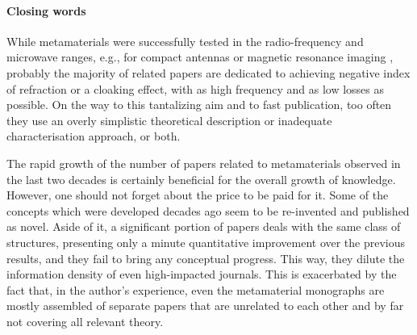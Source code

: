 

\paragraph{Closing words} 
While metamaterials were successfully tested in the radio-frequency and microwave ranges, e.g., for compact antennas or magnetic resonance imaging \cite{freire2008experimental}, probably the majority of related papers are dedicated to achieving negative index of refraction or a cloaking effect, with as high frequency and as low losses as possible.
On the way to this tantalizing aim and to fast publication, too often they use an overly simplistic theoretical description or inadequate characterisation approach, or both. %

The rapid growth of the  number of papers related to metamaterials observed in the last two decades is certainly beneficial for the overall growth of knowledge. However, one should not forget about the price to be paid for it. Some of the concepts which were developed decades ago seem to be re-invented and published as novel. Aside of it, a significant portion of papers deals with the same class of structures, presenting only a minute quantitative improvement over the previous results, and they fail to bring any conceptual progress. This way, they dilute the information density of even high-impacted journals. This is exacerbated by the fact that, in the author's experience, even the metamaterial monographs are mostly assembled of separate papers that are unrelated to each other and by far not covering all relevant theory.

